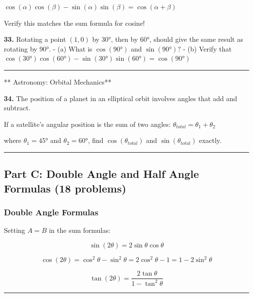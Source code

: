 \documentclass[
  11pt,
]{article}
\begin{document}
\(\cos(\alpha)\cos(\beta) - \sin(\alpha)\sin(\beta) = \cos(\alpha + \beta)\)

Verify this matches the sum formula for cosine!

\textbf{33.} Rotating a point \((1, 0)\) by 30°, then by 60°, should
give the same result as rotating by 90°. - (a) What is \(\cos(90°)\) and
\(\sin(90°)\)? - (b) Verify that
\(\cos(30°)\cos(60°) - \sin(30°)\sin(60°) = \cos(90°)\)

\begin{center}\rule{0.5\linewidth}{0.5pt}\end{center}

** Astronomy: Orbital Mechanics**

\textbf{34.} The position of a planet in an elliptical orbit involves
angles that add and subtract.

If a satellite's angular position is the sum of two angles:
\(\theta_{total} = \theta_1 + \theta_2\)

where \(\theta_1 = 45°\) and \(\theta_2 = 60°\), find
\(\cos(\theta_{total})\) and \(\sin(\theta_{total})\) exactly.

\begin{center}\rule{0.5\linewidth}{0.5pt}\end{center}

\hypertarget{part-c-double-angle-and-half-angle-formulas-18-problems}{%
\subsection{Part C: Double Angle and Half Angle Formulas (18
problems)}\label{part-c-double-angle-and-half-angle-formulas-18-problems}}

\hypertarget{double-angle-formulas}{%
\subsubsection{Double Angle Formulas}\label{double-angle-formulas}}

Setting \(A = B\) in the sum formulas:

\[\boxed{\sin(2\theta) = 2\sin\theta\cos\theta}\]

\[\boxed{\cos(2\theta) = \cos^2\theta - \sin^2\theta = 2\cos^2\theta - 1 = 1 - 2\sin^2\theta}\]

\[\boxed{\tan(2\theta) = \frac{2\tan\theta}{1 - \tan^2\theta}}\]

\begin{center}\rule{0.5\linewidth}{0.5pt}\end{center}
\end{document}
